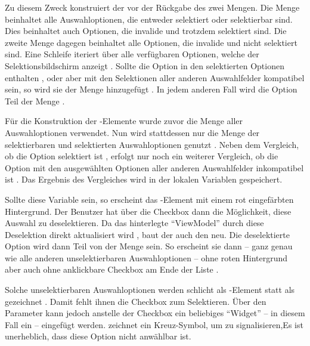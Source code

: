 Zu diesem Zweck konstruiert der  vor der Rückgabe des  zwei Mengen.
Die Menge   beinhaltet alle Auswahloptionen,
die entweder selektiert oder selektierbar sind.
Dies beinhaltet auch Optionen,
die invalide und trotzdem selektiert sind.
Die zweite Menge   dagegen beinhaltet alle Optionen,
die invalide
und nicht selektiert sind.
Eine Schleife iteriert über alle verfügbaren Optionen,
welche der Selektionsbildschirm anzeigt  .
Sollte die Option in den selektierten Optionen enthalten ,
oder aber mit den Selektionen aller anderen Auswahlfelder kompatibel sein,
so wird sie der Menge  hinzugefügt .
In jedem anderen Fall wird die Option Teil der Menge  .

Für die Konstruktion der -Elemente wurde zuvor die Menge aller Auswahloptionen verwendet.
Nun wird stattdessen nur die Menge der selektierbaren und selektierten Auswahloptionen genutzt .
Neben dem Vergleich,
ob die Option selektiert ist ,
erfolgt nur noch ein weiterer Vergleich,
ob die Option mit den ausgewählten Optionen aller anderen Auswahlfelder inkompatibel ist .
Das Ergebnis des Vergleiches wird in der lokalen Variablen  gespeichert.

Sollte diese Variable  sein,
so erscheint das -Element mit einem rot eingefärbten Hintergrund.
Der Benutzer hat über die Checkbox dann die Möglichkeit,
diese Auswahl zu deselektieren.
Da das hinterlegte \enquote{ViewModel} durch diese Deselektion direkt aktualisiert wird ,
baut der  auch den  neu.
Die deselektierte Option wird dann Teil von der Menge   sein.
So erscheint sie dann
-- ganz genau wie alle anderen unselektierbaren Auswahloptionen --
ohne roten Hintergrund aber auch ohne anklickbare Checkbox am Ende der Liste .

Solche unselektierbaren Auswahloptionen werden schlicht als -Element statt als  gezeichnet .
Damit fehlt ihnen die Checkbox zum Selektieren.
Über den Parameter  kann jedoch anstelle der Checkbox ein beliebiges \enquote{Widget}
-- in diesem Fall ein  --
eingefügt werden.
 zeichnet ein Kreuz-Symbol,
um zu signalisieren,Es ist unerheblich,
dass diese Option nicht anwählbar ist. 



